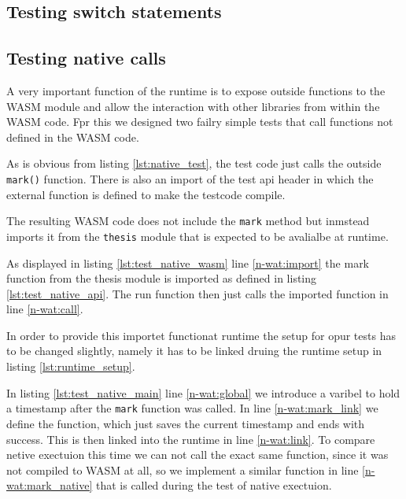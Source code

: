 \subsection{Testing switch statements}

\subsection{Testing native calls}\label{subsec:native}
A very important function of the runtime is to expose outside functions to the WASM module and allow the interaction with other libraries from within the WASM code. Fpr this we designed two failry simple tests that call functions not defined in the WASM code.

As is obvious from listing \ref{lst:native_test}, the test code just calls the outside \lstinline{mark()} function. There is also an import of the test api header in which the external function is defined to make the testcode compile.

The resulting WASM code does not include the \lstinline{mark} method but inmstead imports it from the \lstinline{thesis} module that is expected to be avalialbe at runtime.

As displayed in listing \ref{lst:test_native_wasm} line \ref{n-wat:import} the mark function from the thesis module is imported as defined in listing \ref{lst:test_native_api}. The run function then just calls the imported function in line \ref{n-wat:call}.

In order to provide this importet functionat runtime the setup for opur tests has to be changed slightly, namely it has to be linked druing the runtime setup in listing \ref{lst:runtime_setup}.

In listing \ref{lst:test_native_main} line \ref{n-wat:global} we introduce a varibel to hold a timestamp after the \lstinline{mark} function was called. In line \ref{n-wat:mark_link} we define the function, which just saves the current timestamp and ends with success. This is then linked into the runtime in line \ref{n-wat:link}. To compare netive exectuion this time we can not call the exact same function, since it was not compiled to WASM at all, so we implement a similar function in line \ref{n-wat:mark_native} that is called during the test of native exectuion.